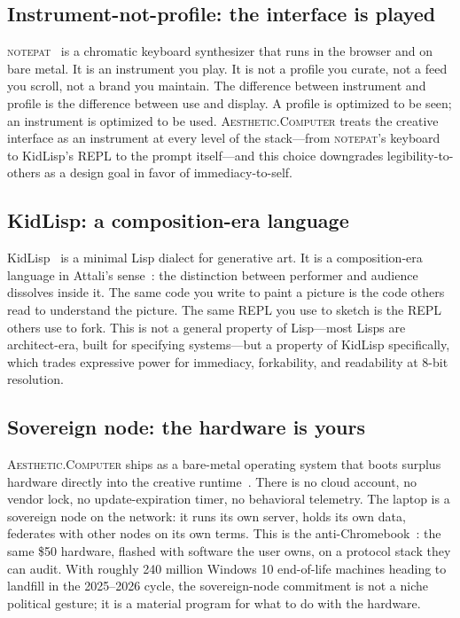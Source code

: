 \documentclass[10pt,letterpaper,twocolumn]{article}
\newcommand{\ac}{\textsc{Aesthetic.Computer}}
\newcommand{\np}{\textsc{notepat}}
\begin{document}
\subsection{Instrument-not-profile: the interface is played}

\np{}~\citep{scudder2026notepat} is a chromatic keyboard synthesizer that runs in the browser and on bare metal. It is an instrument you play. It is not a profile you curate, not a feed you scroll, not a brand you maintain. The difference between instrument and profile is the difference between use and display. A profile is optimized to be seen; an instrument is optimized to be used. \ac{} treats the creative interface as an instrument at every level of the stack---from \np{}'s keyboard to KidLisp's REPL to the prompt itself---and this choice downgrades legibility-to-others as a design goal in favor of immediacy-to-self.

\subsection{KidLisp: a composition-era language}

KidLisp~\citep{scudder2026kidlisp} is a minimal Lisp dialect for generative art. It is a composition-era language in Attali's sense~\citep{attali1985noise}: the distinction between performer and audience dissolves inside it. The same code you write to paint a picture is the code others read to understand the picture. The same REPL you use to sketch is the REPL others use to fork. This is not a general property of Lisp---most Lisps are architect-era, built for specifying systems---but a property of KidLisp specifically, which trades expressive power for immediacy, forkability, and readability at 8-bit resolution.

\subsection{Sovereign node: the hardware is yours}

\ac{} ships as a bare-metal operating system that boots surplus hardware directly into the creative runtime~\citep{scudder2026os, scudder2026identity}. There is no cloud account, no vendor lock, no update-expiration timer, no behavioral telemetry. The laptop is a sovereign node on the network: it runs its own server, holds its own data, federates with other nodes on its own terms. This is the anti-Chromebook~\citep{scudder2026openschools}: the same \$50 hardware, flashed with software the user owns, on a protocol stack they can audit. With roughly 240 million Windows 10 end-of-life machines heading to landfill in the 2025--2026 cycle, the sovereign-node commitment is not a niche political gesture; it is a material program for what to do with the hardware.
\end{document}
